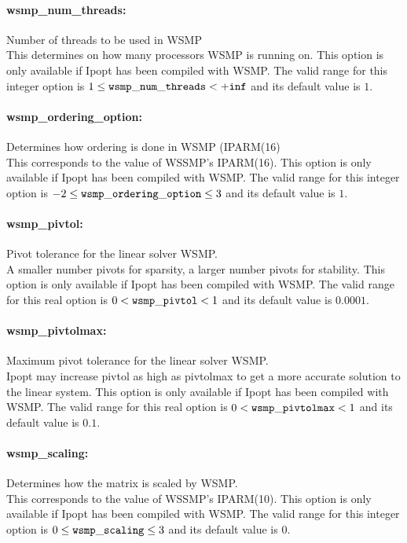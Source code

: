 \paragraph{wsmp\_num\_threads:}\label{sec:wsmp_num_threads} Number of threads to be used in WSMP $\;$ \\
 This determines on how many processors WSMP is
running on.  This option is only available if
Ipopt has been compiled with WSMP. The valid range for this integer option is
$1 \le {\tt wsmp\_num\_threads } <  {\tt +inf}$
and its default value is $1$.


\paragraph{wsmp\_ordering\_option:}\label{sec:wsmp_ordering_option} Determines how ordering is done in WSMP (IPARM(16) $\;$ \\
 This corresponds to the value of WSSMP's
IPARM(16).  This option is only available if
Ipopt has been compiled with WSMP. The valid range for this integer option is
$-2 \le {\tt wsmp\_ordering\_option } \le 3$
and its default value is $1$.


\paragraph{wsmp\_pivtol:}\label{sec:wsmp_pivtol} Pivot tolerance for the linear solver WSMP. $\;$ \\
 A smaller number pivots for sparsity, a larger
number pivots for stability.  This option is only
available if Ipopt has been compiled with WSMP. The valid range for this real option is 
$0 <  {\tt wsmp\_pivtol } <  1$
and its default value is $0.0001$.


\paragraph{wsmp\_pivtolmax:}\label{sec:wsmp_pivtolmax} Maximum pivot tolerance for the linear solver WSMP. $\;$ \\
 Ipopt may increase pivtol as high as pivtolmax to
get a more accurate solution to the linear
system.  This option is only available if Ipopt
has been compiled with WSMP. The valid range for this real option is 
$0 <  {\tt wsmp\_pivtolmax } <  1$
and its default value is $0.1$.


\paragraph{wsmp\_scaling:}\label{sec:wsmp_scaling} Determines how the matrix is scaled by WSMP. $\;$ \\
 This corresponds to the value of WSSMP's
IPARM(10). This option is only available if Ipopt
has been compiled with WSMP. The valid range for this integer option is
$0 \le {\tt wsmp\_scaling } \le 3$
and its default value is $0$.


